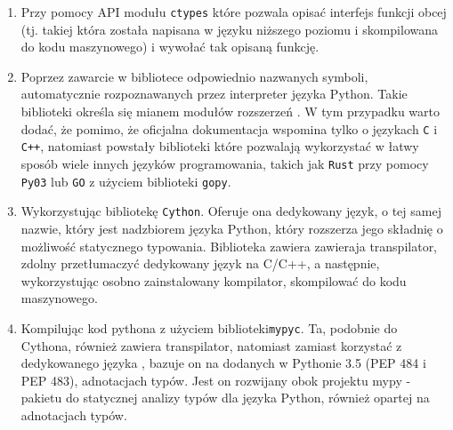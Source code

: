 \documentclass[12pt, a4paper]{article}
\newcommand{\code}[1]{\texttt{#1}}
\begin{document}
\begin{sloppypar}
    \begin{enumerate}
      \item Przy pomocy API modułu \code{ctypes}\cite{Python_ctypes} które pozwala opisać
        interfejs funkcji obcej (tj. takiej która została napisana w języku niższego poziomu
        i skompilowana do kodu maszynowego) i wywołać tak opisaną funkcję.

      \item Poprzez zawarcie w bibliotece odpowiednio nazwanych symboli, automatycznie
        rozpoznawanych przez interpreter języka Python. Takie biblioteki określa się mianem
        modułów rozszerzeń \cite{Extending_Python_With_C_Cpp}. W tym przypadku warto
        dodać, że pomimo, że oficjalna dokumentacja wspomina tylko o językach \code{C} i
        \code{C++}, natomiast powstały biblioteki które pozwalają wykorzystać w łatwy sposób
        wiele innych języków programowania, takich jak \code{Rust} przy pomocy \code{Py03}\cite{PyO3}
        lub \code{GO} z użyciem biblioteki \code{gopy}\cite{gopy}.

      \item Wykorzystując bibliotekę \code{Cython}\cite{Cython_Org}\cite{Cython_The_Best_Of_Both}.
        Oferuje ona dedykowany język, o tej samej nazwie, który jest nadzbiorem języka Python,
        który rozszerza jego składnię o możliwość statycznego typowania. Biblioteka zawiera
        zawieraja transpilator, zdolny przetłumaczyć dedykowany język na C/C++, a następnie,
        wykorzystując osobno zainstalowany kompilator, skompilować do kodu maszynowego.


      \item Kompilując kod pythona z użyciem biblioteki\code{mypyc}\cite{mypyc}. Ta,
        podobnie do Cythona, również zawiera transpilator, natomiast zamiast korzystać z
        dedykowanego języka , bazuje on na dodanych w Pythonie 3.5\cite{Python_3_5} (PEP
        484\cite{PEP_484} i PEP 483\cite{PEP_483}), adnotacjach typów. Jest on rozwijany
        obok projektu mypy - pakietu do statycznej analizy typów dla języka Python,
        również opartej na adnotacjach typów\cite{mypy}.
    \end{enumerate}


\end{sloppypar}
\end{document}
